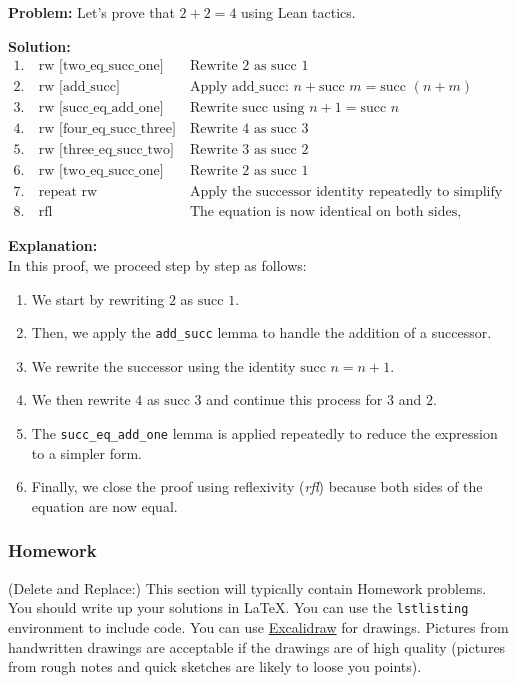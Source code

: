 \documentclass{article}
\theoremstyle{theorem}
\theoremstyle{definition}
\theoremstyle{remark}
\begin{document}
\textbf{Problem:} Let's prove that \(2 + 2 = 4\) using Lean tactics.

\textbf{Solution:}
\begin{align*}
1. &\ \text{rw [two\_eq\_succ\_one]} & \text{Rewrite 2 as } \text{succ } 1 \\
2. &\ \text{rw [add\_succ]} & \text{Apply add\_succ: } n + \text{succ } m = \text{succ } (n + m) \\
3. &\ \text{rw [succ\_eq\_add\_one]} & \text{Rewrite succ using } n + 1 = \text{succ } n \\
4. &\ \text{rw [four\_eq\_succ\_three]} & \text{Rewrite 4 as } \text{succ } 3 \\
5. &\ \text{rw [three\_eq\_succ\_two]} & \text{Rewrite 3 as } \text{succ } 2 \\
6. &\ \text{rw [two\_eq\_succ\_one]} & \text{Rewrite 2 as } \text{succ } 1 \\
7. &\ \text{repeat rw [succ\_eq\_add\_one]} & \text{Apply the successor identity repeatedly to simplify the expression} \\
8. &\ \text{rfl} & \text{The equation is now identical on both sides, completing the proof.}
\end{align*}

\textbf{Explanation:} \\
In this proof, we proceed step by step as follows:
\begin{enumerate}
    \item We start by rewriting \(2\) as \(\text{succ } 1\).
    \item Then, we apply the \texttt{add\_succ} lemma to handle the addition of a successor.
    \item We rewrite the successor using the identity \(\text{succ } n = n + 1\).
    \item We then rewrite \(4\) as \(\text{succ } 3\) and continue this process for \(3\) and \(2\).
    \item The \texttt{succ\_eq\_add\_one} lemma is applied repeatedly to reduce the expression to a simpler form.
    \item Finally, we close the proof using reflexivity (\emph{rfl}) because both sides of the equation are now equal.
\end{enumerate}


\subsubsection*{Homework}

(Delete and Replace:) This section will typically contain Homework problems. You should write up your solutions in \LaTeX. You can use the \texttt{lstlisting} environment to include code. You can use \href{https://excalidraw.com/}{Excalidraw} for drawings. Pictures from handwritten drawings are acceptable if the drawings are of high quality (pictures from rough notes and quick sketches are likely to loose you points). 
\end{document}
